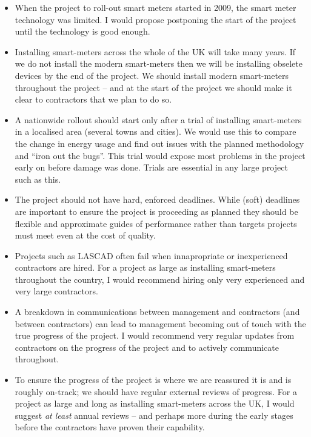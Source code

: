\documentclass[10pt,\jkfside,a4paper]{article}
\begin{document}
\begin{enumerate}
\begin{enumerate}
\begin{itemize}
\item When the project to roll-out smart meters started in 2009, the smart meter technology was 
limited. I would propose postponing the start of the project until the technology is good enough.

\item Installing smart-meters across the whole of the UK will take many years. If we do not install the 
modern smart-meters then we will be installing obselete devices by the end of the project. We should 
install modern smart-meters throughout the project -- and at the 
start of the project we should make it clear to contractors that we plan to do so.

\item A nationwide rollout should start only after a trial of installing smart-meters in a 
localised area (several towns and cities). We would use this to compare the change in energy usage and 
find out issues with the planned methodology and ``iron out the bugs''. This trial would expose most 
problems in the project early on before damage was done. Trials are essential in any large project 
such as this.

\item The project should not have hard, enforced deadlines. While (soft) deadlines are 
important to ensure the project is proceeding as planned they should be flexible and approximate guides 
of performance rather than targets projects must meet even at the cost of quality.

\item Projects such as LASCAD often fail when innapropriate or inexperienced contractors are hired. 
For a project as large as installing smart-meters throughout the country, I would recommend hiring 
only very experienced and very large contractors.

\item A breakdown in communications between management and contractors (and between contractors) can 
lead to management becoming out of touch with the true progress of the project. 
I would recommend very regular updates from contractors on the progress of the project and to actively 
communicate throughout.

\item To ensure the progress of the project is where we are reassured it is and is roughly on-track; we 
should have regular external reviews of progress. For a project as large and long as installing smart-meters 
across the UK, I would suggest \textit{at least} annual reviews -- and perhaps more during the early stages 
before the contractors have proven their capability.


\end{itemize}
\end{enumerate}
\end{enumerate}
\end{document}
